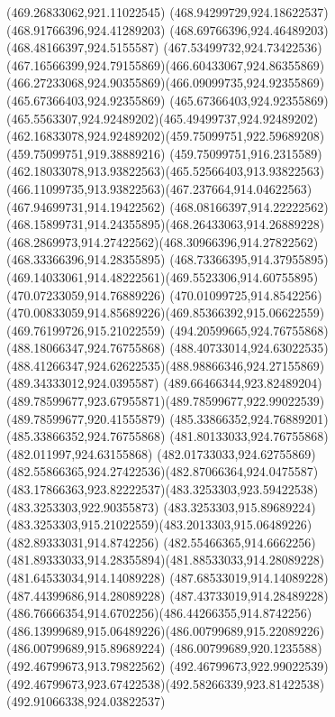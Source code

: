 {{{{				\lineto(469.26833062,921.11022545)
				\lineto(468.94299729,924.18622537)
				\lineto(468.91766396,924.41289203)
				\lineto(468.69766396,924.46489203)
				\lineto(468.48166397,924.5155587)
				\curveto(467.53499732,924.73422536)(467.16566399,924.79155869)(466.60433067,924.86355869)
				\curveto(466.27233068,924.90355869)(466.09099735,924.92355869)(465.67366403,924.92355869)
				\curveto(465.67366403,924.92355869)(465.5563307,924.92489202)(465.49499737,924.92489202)
				\curveto(462.16833078,924.92489202)(459.75099751,922.59689208)(459.75099751,919.38889216)
				\curveto(459.75099751,916.2315589)(462.18033078,913.93822563)(465.52566403,913.93822563)
				\curveto(466.11099735,913.93822563)(467.237664,914.04622563)(467.94699731,914.19422562)
				\curveto(468.08166397,914.22222562)(468.15899731,914.24355895)(468.26433063,914.26889228)
				\curveto(468.2869973,914.27422562)(468.30966396,914.27822562)(468.33366396,914.28355895)
				\curveto(468.73366395,914.37955895)(469.14033061,914.48222561)(469.5523306,914.60755895)
				\lineto(470.07233059,914.76889226)
				\lineto(470.01099725,914.8542256)
				\curveto(470.00833059,914.85689226)(469.85366392,915.06622559)(469.76199726,915.21022559)
				\moveto(494.20599665,924.76755868)
				\lineto(488.18066347,924.76755868)
				\lineto(488.40733014,924.63022535)
				\curveto(488.41266347,924.62622535)(488.98866346,924.27155869)(489.34333012,924.0395587)
				\curveto(489.66466344,923.82489204)(489.78599677,923.67955871)(489.78599677,922.99022539)
				\lineto(489.78599677,920.41555879)
				\lineto(485.33866352,924.76889201)
				\lineto(485.33866352,924.76755868)
				\lineto(481.80133033,924.76755868)
				\lineto(482.011997,924.63155868)
				\curveto(482.01733033,924.62755869)(482.55866365,924.27422536)(482.87066364,924.0475587)
				\curveto(483.17866363,923.82222537)(483.3253303,923.59422538)(483.3253303,922.90355873)
				\lineto(483.3253303,915.89689224)
				\curveto(483.3253303,915.21022559)(483.2013303,915.06489226)(482.89333031,914.8742256)
				\curveto(482.55466365,914.6662256)(481.89333033,914.28355894)(481.88533033,914.28089228)
				\lineto(481.64533034,914.14089228)
				\lineto(487.68533019,914.14089228)
				\lineto(487.44399686,914.28089228)
				\curveto(487.43733019,914.28489228)(486.76666354,914.6702256)(486.44266355,914.8742256)
				\curveto(486.13999689,915.06489226)(486.00799689,915.22089226)(486.00799689,915.89689224)
				\lineto(486.00799689,920.1235588)
				\lineto(492.46799673,913.79822562)
				\lineto(492.46799673,922.99022539)
				\curveto(492.46799673,923.67422538)(492.58266339,923.81422538)(492.91066338,924.03822537)
}}}}
